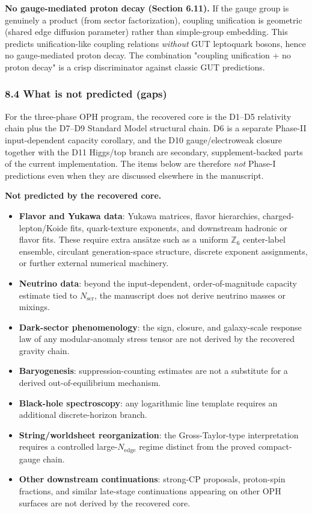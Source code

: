 \textbf{No gauge-mediated proton decay (Section 6.11).} If the gauge group is genuinely a product (from sector factorization), coupling unification is geometric (shared edge diffusion parameter) rather than simple-group embedding. This predicts unification-like coupling relations \emph{without} GUT leptoquark bosons, hence no gauge-mediated proton decay. The combination "coupling unification + no proton decay" is a crisp discriminator against classic GUT predictions.

\subsubsection{8.4 What is not predicted (gaps)}\label{84-what-is-not-predicted-gaps}

For the three-phase OPH program, the recovered core is the D1--D5 relativity chain plus the D7--D9 Standard Model structural chain. D6 is a separate Phase-II input-dependent capacity corollary, and the D10 gauge/electroweak closure together with the D11 Higgs/top branch are secondary, supplement-backed parts of the current implementation. The items below are therefore \emph{not} Phase-I predictions even when they are discussed elsewhere in the manuscript.

\textbf{Not predicted by the recovered core.}
\begin{itemize}
\item \textbf{Flavor and Yukawa data}: Yukawa matrices, flavor hierarchies, charged-lepton/Koide fits, quark-texture exponents, and downstream hadronic or flavor fits. These require extra ans\"atze such as a uniform \(\mathbb Z_6\) center-label ensemble, circulant generation-space structure, discrete exponent assignments, or further external numerical machinery.
\item \textbf{Neutrino data}: beyond the input-dependent, order-of-magnitude capacity estimate tied to $N_{\mathrm{scr}}$, the manuscript does not derive neutrino masses or mixings.
\item \textbf{Dark-sector phenomenology}: the sign, closure, and galaxy-scale response law of any modular-anomaly stress tensor are not derived by the recovered gravity chain.
\item \textbf{Baryogenesis}: suppression-counting estimates are not a substitute for a derived out-of-equilibrium mechanism.
\item \textbf{Black-hole spectroscopy}: any logarithmic line template requires an additional discrete-horizon branch.
\item \textbf{String/worldsheet reorganization}: the Gross-Taylor-type interpretation requires a controlled large-\(N_{\mathrm{edge}}\) regime distinct from the proved compact-gauge chain.
\item \textbf{Other downstream continuations}: strong-CP proposals, proton-spin fractions, and similar late-stage continuations appearing on other OPH surfaces are not derived by the recovered core.
\end{itemize}


